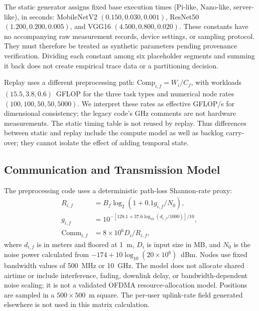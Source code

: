 \documentclass[pdflatex,sn-mathphys-num]{sn-jnl}
\begin{document}
The static generator assigns fixed base execution times (Pi-like, Nano-like, server-like), in seconds: MobileNetV2 $(0.150,0.030,0.001)$, ResNet50 $(1.200,0.200,0.005)$, and VGG16 $(4.500,0.800,0.020)$. These constants have no accompanying raw measurement records, device settings, or sampling protocol. They must therefore be treated as synthetic parameters pending provenance verification. Dividing each constant among six placeholder segments and summing it back does not create empirical trace data or a partitioning decision.

Replay uses a different preprocessing path: $\mathrm{Comp}_{i,f}=W_i/C_f$, with workloads $(15.5,3.8,0.6)$~GFLOP for the three task types and numerical node rates $(100,100,50,50,5000)$. We interpret these rates as effective GFLOP/s for dimensional consistency; the legacy code's GHz comments are not hardware measurements. The static timing table is not reused by replay. Thus differences between static and replay include the compute model as well as backlog carry-over; they cannot isolate the effect of adding temporal state.

\subsection{Communication and Transmission Model}
The preprocessing code uses a deterministic path-loss Shannon-rate proxy:
\begin{align}
 R_{i,f}&=B_f\log_2\left(1+0.1g_{i,f}/N_0\right),\\
 g_{i,f}&=10^{-[128.1+37.6\log_{10}(d_{i,f}/1000)]/10},\\
 \mathrm{Comm}_{i,f}&=8\times10^6D_i/R_{i,f},
\end{align}
where $d_{i,f}$ is in meters and floored at 1~m, $D_i$ is input size in MB, and $N_0$ is the noise power calculated from $-174+10\log_{10}(20\times10^6)$~dBm. Nodes use fixed bandwidth values of 500~MHz or 10~GHz. The model does not allocate shared airtime or include interference, fading, downlink delay, or bandwidth-dependent noise scaling; it is not a validated OFDMA resource-allocation model. Positions are sampled in a $500\times500$~m square. The per-user uplink-rate field generated elsewhere is not used in this matrix calculation.
\end{document}

